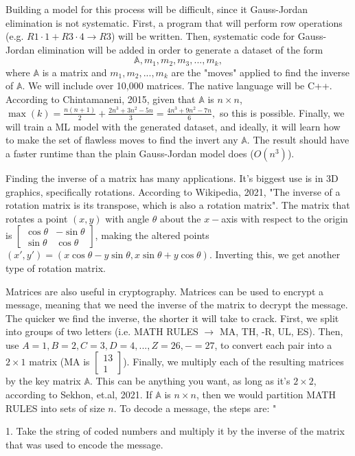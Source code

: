 \documentclass{article}
\begin{document}
\par Building a model for this process will be difficult, since it Gauss-Jordan elimination is not systematic. First, a program that will perform row operations (e.g. $R1\cdot 1+R3\cdot 4 \to R3$) will be written. Then, systematic code for Gauss-Jordan elimination will be added in order to generate a dataset of the form
$$\mathbb{A}, m_1, m_2, m_3, ..., m_k,$$
where $\mathbb{A}$ is a matrix and $m_1,m_2,...,m_k$ are the "moves" applied to find the inverse of $\mathbb{A}$. We will include over 10,000 matrices. The native language will be C++. According to Chintamaneni, 2015, given that $\mathbb{A}$ is $n\times n$, $\max(k)=\frac{n(n+1)}{2}+\frac{2n^3+3n^2-5n}{3}=\frac{4n^3+9n^2-7n}{6},$ so this is possible. Finally, we will train a ML model with the generated dataset, and ideally, it will learn how to make the set of flawless moves to find the invert any $\mathbb{A}$. The result should have a faster runtime than the plain Gauss-Jordan model does ($O(n^3)$).  
\par Finding the inverse of a matrix has many applications. It's biggest use is in 3D graphics, specifically rotations. According to Wikipedia, 2021, "The inverse of a rotation matrix is its transpose, which is also a rotation matrix". The matrix that rotates a point $(x,y)$ with angle $\theta$ about the $x-$axis with respect to the origin is $\begin{bmatrix}\cos\theta & -\sin\theta\\ \sin\theta & \cos\theta\end{bmatrix}$, making the altered points $(x',y')=(x\cos\theta-y\sin\theta,x\sin\theta+y\cos\theta)$. Inverting this, we get another type of rotation matrix.
\par Matrices are also useful in cryptography. Matrices can be used to encrypt a message, meaning that we need the inverse of the matrix to decrypt the message. The quicker we find the inverse, the shorter it will take to crack. First, we split into groups of two letters (i.e. MATH RULES $\to$ MA, TH, -R, UL, ES). Then, use $A=1, B=2, C=3, D=4, ..., Z=26, -=27$, to convert each pair into a $2\times 1$ matrix (MA is $\begin{bmatrix}13\\ 1\end{bmatrix}$). Finally, we multiply each of the resulting matrices by the key matrix $\mathbb{A}$. This can be anything you want, as long as it's $2\times 2$, according to Sekhon, et.al, 2021. If $\mathbb{A}$ is $n\times n$, then we would partition MATH RULES into sets of size $n$. To decode a message, the steps are: "
 \par 1. Take the string of coded numbers and multiply it by the inverse of the matrix that was used to encode the message.
\end{document}
